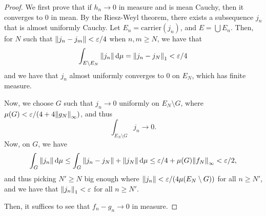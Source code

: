 \begin{proof}
    We first prove that if $h_n \to 0$ in measure and is mean Cauchy, then it converges to $0$ in mean. By the Riesz-Weyl theorem, there exists a subsequence $j_n$ that is almost uniformly Cauchy. Let $E_n = \mathrm{carrier}(j_n)$, and $E = \bigcup E_n$. Then, for $N$ such that $\norm{j_n - j_m} < \varepsilon/4$ when $n, m \ge N$, we have that \[\int_{E \setminus E_N} \norm{j_n} \dd{\mu} = \norm{j_n - j_N}_1 < \varepsilon/4\] and we have that $j_n$ almost uniformly converges to $0$ on $E_N$, which has finite measure.

    Now, we choose $G$ such that $j_n \to 0$ uniformly on $E_N \setminus G$, where $\mu(G) < \varepsilon/(4 + 4\norm{g_N}_\infty)$, and thus \[\int_{E_N \setminus G} j_n \to 0.\] Now, on $G$, we have \[\int_G \norm{j_n} \dd{\mu} \le \int_G \norm{j_n - j_N} + \norm{j_N} \dd{\mu}\le \varepsilon/4 + \mu(G)\norm{f_N}_\infty < \varepsilon/2,\] and thus picking $N' \ge N$ big enough where $\norm{j_n} < \varepsilon/(4\mu(E_N \setminus G))$ for all $n \ge N'$, and we have that $\norm{j_n}_1 < \varepsilon$ for all $n \ge N'$.    

    Then, it suffices to see that $f_n - g_n \to 0$ in measure.
\end{proof}

